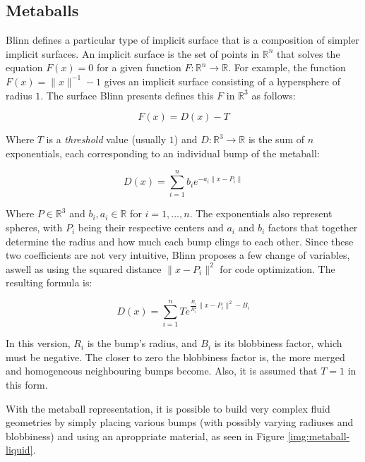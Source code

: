 \documentclass[conference]{acmsiggraph}
\begin{document}
\subsection{Metaballs}

Blinn  defines a particular type of
implicit surface that is a composition of simpler implicit surfaces. An implicit
surface is the set of points in $\mathbb{R}^n$ that solves the equation
$F(x) = 0$ for a given function $F:\mathbb{R}^n \rightarrow \mathbb{R}$. For
example, the function $F(x) = \|x\|^{-1} - 1$ gives an implicit surface
consisting of a hypersphere of radius $1$. The surface Blinn presents defines
this $F$ in $\mathbb{R}^3$ as follows:

\begin{equation}
  F(x) = D(x) - T
\end{equation}

Where $T$ is a \textit{threshold} value (usually $1$) and
$D:\mathbb{R}^3 \rightarrow \mathbb{R}$ is the sum of $n$ exponentials, each
corresponding to an individual bump of the metaball:

\begin{equation}
  D(x) = \sum_{i=1}^{n} b_i e^{-a_i \|x-P_i\|}
\end{equation}

Where $P\in\mathbb{R}^3$ and $b_i,a_i\in\mathbb{R}$ for $i=1,...,n$. The
exponentials also represent spheres, with $P_i$ being their respective centers
and $a_i$ and $b_i$ factors that together determine the radius and how much each
bump clings to each other. Since these two coefficients are not very intuitive,
Blinn proposes a few change of variables, aswell as using the squared distance
$\|x-P_i\|^2$ for code optimization. The resulting formula is:

\begin{equation}
  D(x) = \sum_{i=1}^{n} T e^{\frac{B_i}{R_i^2}\|x-P_i\|^2 - B_i}
\end{equation}

In this version, $R_i$ is the bump's radius, and $B_i$ is its blobbiness
factor, which must be negative. The closer to zero the blobbiness factor is,
the more merged and homogeneous neighbouring bumps become. Also, it is assumed
that $T=1$ in this form.

With the metaball representation, it is possible to build very complex fluid
geometries by simply placing various bumps (with possibly varying radiuses and
blobbiness) and using an aproppriate material, as seen in Figure
\ref{img:metaball-liquid}\footnotemark{}.
\end{document}
